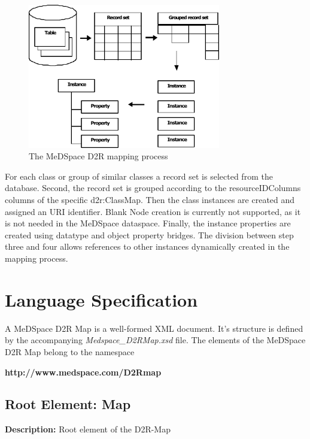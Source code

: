 \begin{figure}[H]
	\begin{center}
		\includegraphics [width=0.75\textwidth]{../images/MappingProcess.pdf}
	\end{center}
	\caption{The MeDSpace D2R mapping process}
	\label{MappingProcessFigure}
\end{figure}

For each class or group of similar classes a record set is selected from the
database. Second, the record set is grouped according to the resourceIDColumns columns of
the specific d2r:ClassMap. Then the class instances are created and assigned an URI identifier. Blank Node creation is currently not supported, as it is not needed in the MeDSpace dataspace. Finally, the instance properties are created using
datatype and object property bridges.
The division between step three and four allows references to other instances dynamically created in the mapping process.

\chapter{Language Specification}

A MeDSpace D2R Map is a well-formed XML document. It's structure is defined by the accompanying \textit{Medspace{\_}D2RMap.xsd} file. The elements of the MeDSpace D2R Map belong to the namespace
\begin{center}
	\textbf{http://www.medspace.com/D2Rmap}
\end{center}

\section{Root Element: Map}
\textbf{Description:} \newline
Root element of the D2R-Map

